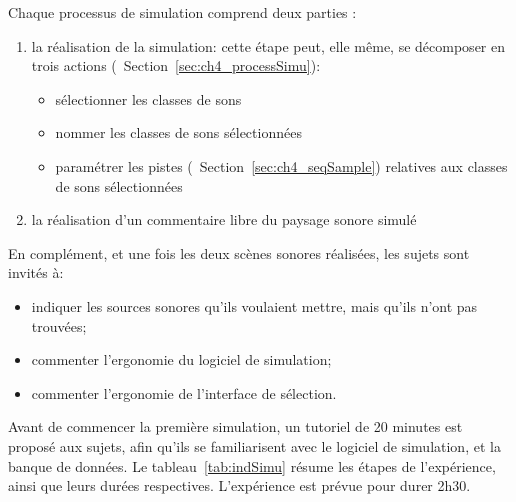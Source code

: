 Chaque processus de simulation comprend deux parties :

\begin{enumerate}
\item la réalisation de la simulation: cette étape peut, elle même, se décomposer en trois actions (\cf~Section~\ref{sec:ch4_processSimu}):
\begin{itemize}
\item sélectionner les classes de sons
\item nommer les classes de sons sélectionnées
\item paramétrer les pistes (\cf~Section~\ref{sec:ch4_seqSample}) relatives aux classes de sons sélectionnées
\end{itemize}
\item la réalisation d'un commentaire libre du paysage sonore simulé
\end{enumerate}

En complément, et une fois les deux scènes sonores réalisées, les sujets sont invités à:

\begin{itemize}
\item indiquer les sources sonores qu'ils voulaient mettre, mais qu'ils n'ont pas trouvées;
\item commenter l’ergonomie du logiciel de simulation;
\item commenter l’ergonomie de l'interface de sélection.
\end{itemize}

Avant de commencer la première simulation, un tutoriel de 20 minutes est proposé aux sujets, afin qu'ils se familiarisent avec le logiciel de simulation, et la banque de données. Le tableau~\ref{tab:indSimu} résume les étapes de l’expérience, ainsi que leurs durées respectives. L'expérience est prévue pour durer 2h30. \\

